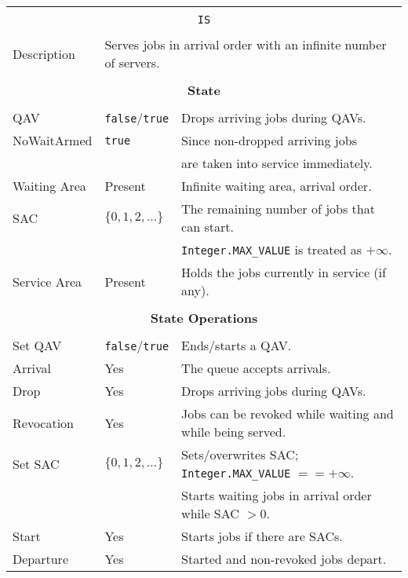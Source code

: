 \documentclass[12pt]{book}
\begin{document}
\begin{tabular}{|l|l|l|}
\hline
\multicolumn{3}{|c|}{} \\
\multicolumn{3}{|c|}{\lstinline[basicstyle=\large]{IS}} \\
\multicolumn{3}{|c|}{} \\
\hline
Description & \multicolumn{2}{|l|}{Serves jobs in arrival order with an infinite number of servers.} \\
\hline
\multicolumn{3}{|c|}{} \\
\multicolumn{3}{|c|}{\bf State} \\
\multicolumn{3}{|c|}{} \\
\hline
QAV & \lstinline|false|/\lstinline|true| & Drops arriving jobs during QAVs. \\
\hline
NoWaitArmed & \lstinline|true| & Since non-dropped arriving jobs \\
            &                  & are taken into service immediately. \\
\hline
Waiting Area & Present & Infinite waiting area, arrival order. \\
\hline
SAC & $\{0, 1, 2, \ldots\}$ & The remaining number of jobs that can start. \\
    &                       & \lstinline|Integer.MAX_VALUE| is treated as $+\infty$. \\
\hline
Service Area & Present & Holds the jobs currently in service (if any). \\
\hline
\multicolumn{3}{|c|}{} \\
\multicolumn{3}{|c|}{\bf State Operations} \\
\multicolumn{3}{|c|}{} \\
\hline
Set QAV & \lstinline|false|/\lstinline|true| & Ends/starts a QAV. \\
\hline
Arrival & Yes & The queue accepts arrivals. \\
\hline
Drop & Yes & Drops arriving jobs during QAVs. \\
\hline
Revocation & Yes & Jobs can be revoked while waiting and while being served. \\
\hline
Set SAC & $\{0, 1, 2, \ldots\}$ & Sets/overwrites SAC; \lstinline|Integer.MAX_VALUE| $== +\infty$. \\
        &                       & Starts waiting jobs in arrival order while SAC $> 0$. \\
\hline
Start & Yes & Starts jobs if there are SACs. \\
\hline
Departure & Yes & Started and non-revoked jobs depart. \\

\end{tabular}
\end{document}
